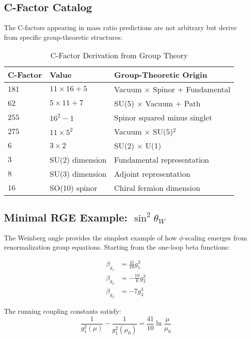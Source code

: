 \documentclass[11pt]{article}
\theoremstyle{definition}
\newcommand{\goldenratio}{\phi}
\begin{document}
\subsection{C-Factor Catalog}

The C-factors appearing in mass ratio predictions are not arbitrary but derive from specific group-theoretic structures:

\begin{table}[H]
\centering
\caption{C-Factor Derivation from Group Theory}
\begin{tabular}{@{}lll@{}}
\toprule
\textbf{C-Factor} & \textbf{Value} & \textbf{Group-Theoretic Origin} \\
\midrule
$181$ & $11 \times 16 + 5$ & Vacuum $\times$ Spinor + Fundamental \\
$62$ & $5 \times 11 + 7$ & SU(5) $\times$ Vacuum + Path \\
$255$ & $16^2 - 1$ & Spinor squared minus singlet \\
$275$ & $11 \times 5^2$ & Vacuum $\times$ SU(5)$^2$ \\
$6$ & $3 \times 2$ & SU(2) $\times$ U(1) \\
$3$ & SU(2) dimension & Fundamental representation \\
$8$ & SU(3) dimension & Adjoint representation \\
$16$ & SO(10) spinor & Chiral fermion dimension \\
\bottomrule
\end{tabular}
\label{tab:cfactor_catalog}
\end{table}

\subsection{Minimal RGE Example: $\sin^2\theta_W$}

The Weinberg angle provides the simplest example of how $\goldenratio$-scaling emerges from renormalization group equations. Starting from the one-loop beta functions:

\begin{align}
\beta_{g_1} &= \frac{41}{10}g_1^3 \\
\beta_{g_2} &= -\frac{19}{6}g_2^3 \\
\beta_{g_3} &= -7g_3^3
\end{align}

The running coupling constants satisfy:
\begin{equation}
\frac{1}{g_1^2(\mu)} - \frac{1}{g_1^2(\mu_0)} = \frac{41}{10}\ln\frac{\mu}{\mu_0}
\end{equation}
\end{document}
